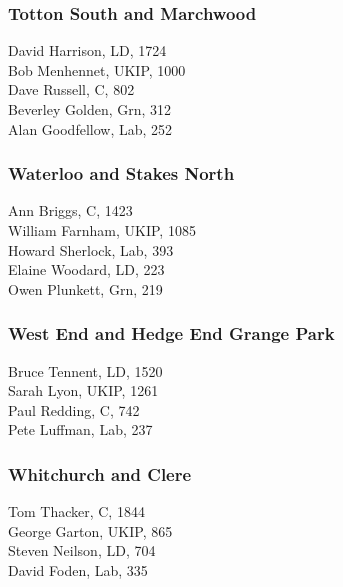 \documentclass[a4paper,openany,10pt]{book}
\begin{document}
\subsubsection*{Totton South and Marchwood}



David Harrison, LD, 1724\\
Bob Menhennet, UKIP, 1000\\
Dave Russell, C, 802\\
Beverley Golden, Grn, 312\\
Alan Goodfellow, Lab, 252\\


\subsubsection*{Waterloo and Stakes North}



Ann Briggs, C, 1423\\
William Farnham, UKIP, 1085\\
Howard Sherlock, Lab, 393\\
Elaine Woodard, LD, 223\\
Owen Plunkett, Grn, 219\\


\subsubsection*{West End and Hedge End Grange Park}



Bruce Tennent, LD, 1520\\
Sarah Lyon, UKIP, 1261\\
Paul Redding, C, 742\\
Pete Luffman, Lab, 237\\


\subsubsection*{Whitchurch and Clere}



Tom Thacker, C, 1844\\
George Garton, UKIP, 865\\
Steven Neilson, LD, 704\\
David Foden, Lab, 335\\
\end{document}
